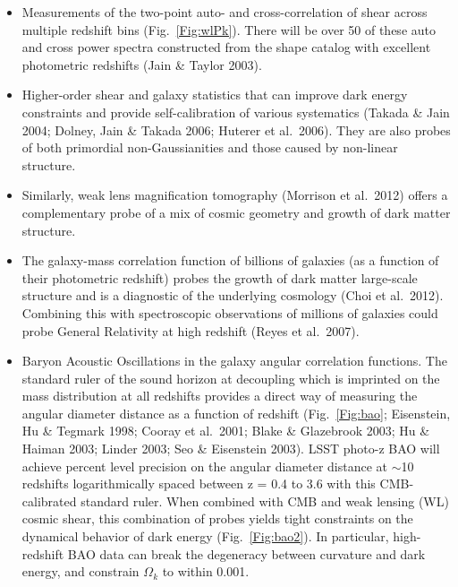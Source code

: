 \documentclass{emulateapj}
\begin{document}
\begin{itemize}
\item Measurements of the two-point auto- and cross-correlation of
  shear across multiple redshift bins (Fig.~\ref{Fig:wlPk}). There will be 
over 50 of these auto and cross power spectra constructed from the
shape catalog with excellent photometric redshifts
(Jain \& Taylor 2003).
\item Higher-order shear and galaxy statistics that can improve dark energy 
constraints and provide self-calibration of various systematics (Takada \& Jain 2004; 
Dolney, Jain \& Takada 2006; Huterer et al.~2006). They are also probes of both
primordial non-Gaussianities and those caused by non-linear structure.
\item Similarly, weak lens magnification tomography (Morrison et al.~2012) offers a 
complementary probe of a mix of cosmic geometry and growth of dark matter structure.
\item The galaxy-mass correlation function of billions of galaxies (as a function of their 
photometric redshift) probes the growth of dark matter large-scale structure and is a 
diagnostic of the underlying cosmology (Choi et al.~2012). Combining this with
spectroscopic observations of millions of galaxies could probe General Relativity at high 
redshift (Reyes et al.~2007).
\item Baryon Acoustic Oscillations in the galaxy angular correlation functions.
The standard ruler of the sound horizon at decoupling which is imprinted on the mass 
distribution at all redshifts provides a direct way of measuring the angular diameter
distance as a function of redshift (Fig.~\ref{Fig:bao}; Eisenstein, Hu \& Tegmark 1998;
Cooray et al.~2001; Blake \& Glazebrook 2003; Hu \& Haiman 2003; Linder 2003; Seo \& 
Eisenstein 2003). LSST photo-z BAO will achieve percent level precision on the angular 
diameter distance at $\sim$10 redshifts logarithmically spaced between z = 0.4 to 3.6 
with this CMB-calibrated standard ruler. When combined with CMB 
and weak lensing (WL) cosmic shear, this combination of probes yields tight constraints on the 
dynamical behavior of dark energy (Fig.~\ref{Fig:bao2}). In particular, high-redshift BAO data can break 
the degeneracy between curvature and dark energy, and constrain $\Omega_k$ to within 
0.001.

\end{itemize}
\end{document}
